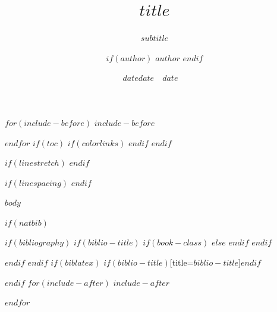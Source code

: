 \documentclass[$if(fontsize)$$fontsize$,$endif$$if(lang)$$babel-lang$,$endif$$if(papersize)$$papersize$paper,$endif$$for(classoption)$$classoption$$sep$,$endfor$]{$if(documentclass)$$documentclass$$else$letter$endif$}
\date{$date$}
\title{$title$}
\subtitle{$subtitle$}
\institute{$for(institute)$$institute$$sep$ \and $endfor$}
\author{$if(author)$ $author$ $endif$}
\date{$date$}
\date{\Date~\Month~\Year}
\date{$date$}
\date{\@Date~\@Month~\@Year}
\begin{document}
\maketitle

$for(include-before)$
$include-before$

$endfor$
$if(toc)$
{
$if(colorlinks)$
\hypersetup{linkcolor=$if(toccolor)$$toccolor$$else$$endif$}
$endif$
\setcounter{tocdepth}{$toc-depth$}
\tableofcontents
}
$endif$



$if(linestretch)$
$endif$

$if(linespacing)$
$endif$

$body$



$if(natbib)$

$if(bibliography)$
$if(biblio-title)$
$if(book-class)$
\renewcommand\bibname{$biblio-title$}
$else$
\renewcommand\refname{$biblio-title$}
$endif$
$endif$

$endif$
$endif$
$if(biblatex)$
\printbibliography$if(biblio-title)$[title=$biblio-title$]$endif$

$endif$
$for(include-after)$
$include-after$

$endfor$
\end{document}
